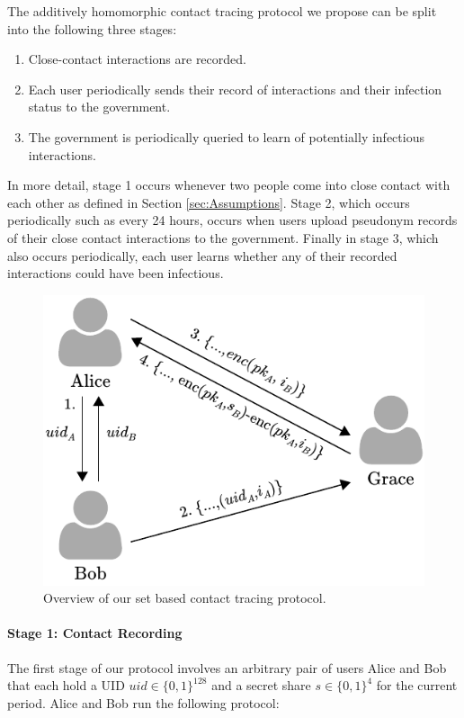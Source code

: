 \documentclass{article}
\begin{document}
The additively homomorphic contact tracing protocol we propose can be split into the following three stages:
\begin{enumerate}
    \item Close-contact interactions are recorded.
    \item Each user periodically sends their record of interactions and their infection status to the government. 
    \item The government is periodically queried to learn of potentially infectious interactions.
\end{enumerate}

In more detail, stage 1 occurs whenever two people come into close contact with each other as defined in Section \ref{sec:Assumptions}. Stage 2, which occurs periodically such as every 24 hours, occurs when users upload pseudonym records of their close contact interactions to the government. Finally in stage 3, which also occurs periodically, each user learns whether any of their recorded interactions could have been infectious.

\begin{figure}
    \centering
    \includegraphics[scale=0.7]{method_2.pdf}
    \caption{Overview of our set based contact tracing protocol.}
    \label{fig:set_based_protocol_1}
\end{figure}


\paragraph{Stage 1: Contact Recording}
The first stage of our protocol involves an arbitrary pair of users Alice and Bob that each hold a UID $uid \in \{0,1\}^{128}$ and a secret share $s \in \{0,1\}^4$ for the current period. Alice and Bob run the following protocol:
\end{document}
